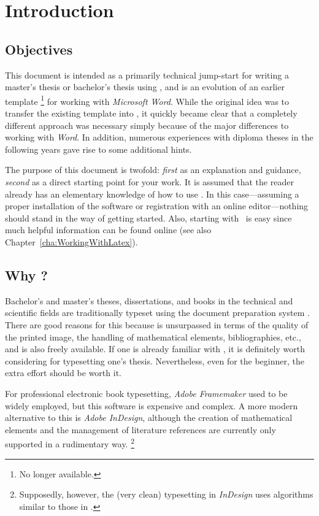 \chapter{Introduction}
\label{cha:Introduction}


\section{Objectives}

This document is intended as a primarily technical jump-start for writing a
master's thesis or bachelor's thesis using \latex, and is an evolution of an
earlier template%
\footnote{No longer available.}
for working with \emph{Microsoft Word}. While the original idea was to transfer
the existing template into \latex, it quickly became clear that a completely
different approach was necessary simply because of the major differences to
working with \emph{Word}. In addition, numerous experiences with diploma theses
in the following years gave rise to some additional hints.

The purpose of this document is twofold: \emph{first} as an explanation and
guidance, \emph{second} as a direct starting point for your work. It is assumed
that the reader already has an elementary knowledge of how to use \latex. In
this case---assuming a proper installation of the software or registration with
an \latex online editor---nothing should stand in the way of getting started.
Also, starting with \latex\ is easy since much helpful information can be
found online (see also Chapter~\ref{cha:WorkingWithLatex}).


\section{Why {\latex}?}

Bachelor's and master's theses, dissertations, and books in the technical and
scientific fields are traditionally typeset using the document preparation
system \latex \cite{Lamport1994, Lamport1995}. There are good reasons for this
because \latex is unsurpassed in terms of the quality of the printed image, the
handling of mathematical elements, bibliographies, etc., and is also freely
available. If one is already familiar with \latex, it is definitely worth
considering for typesetting one's thesis. Nevertheless, even for the beginner,
the extra effort should be worth it.

For professional electronic book typesetting, \emph{Adobe Framemaker} used to be
widely employed, but this software is expensive and complex. A more modern
alternative to this is \emph{Adobe InDesign}, although the creation of
mathematical elements and the management of literature references are currently
only supported in a rudimentary way.%
\footnote{Supposedly, however, the (very clean) typesetting in \emph{InDesign}
uses algorithms similar to those in \latex.}

